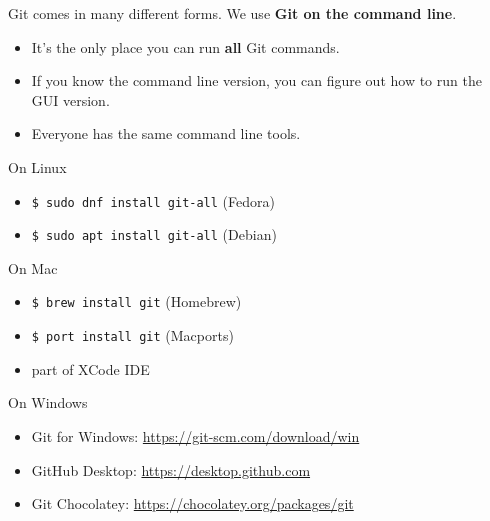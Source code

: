 \begin{frame}[fragile]
\emptyframetitle

  Git comes in many different forms. We use \textbf{Git on the command line}.

  \begin{itemize}
  \item It's the only place you can run \textbf{all} Git commands.
  \item If you know the command line version, you can figure out how to run the GUI version.
  \item Everyone has the same command line tools.
  \end{itemize}

  \vspace*{0.15cm}
  On Linux 
  \begin{itemize}
    \item[] \texttt{\$ sudo dnf install git-all} (Fedora) 
    \item[] \texttt{\$ sudo apt install git-all} (Debian)
  \end{itemize}
  \vspace*{0.15cm}

  On Mac 
  \begin{itemize}
    \item[] \texttt{\$ brew install git} (Homebrew) 
    \item[] \texttt{\$ port install git} (Macports)
    \item[] part of XCode IDE
  \end{itemize}
  \vspace*{0.15cm}

  On Windows 
  \begin{itemize}
    \item[] Git for Windows: \url{https://git-scm.com/download/win} 
    \item[] GitHub Desktop: \url{https://desktop.github.com}
    \item[] Git Chocolatey: \url{https://chocolatey.org/packages/git}
  \end{itemize}

\end{frame}

